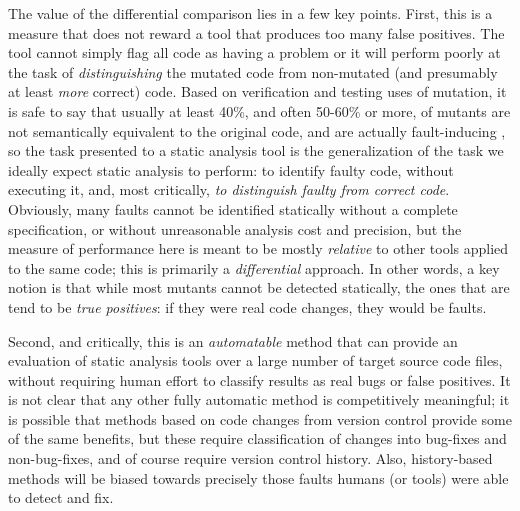 The value of the differential comparison lies in a few key points.  First, this is a measure that does not reward a tool that produces too many false positives.  The tool cannot simply flag all code as having a problem or it will perform poorly at the task of \emph{distinguishing} the mutated code from non-mutated (and presumably at least \emph{more} correct) code.  Based on verification and testing uses of mutation, it is safe to say that usually at least 40\%, and often 50-60\% or more, of mutants are not semantically equivalent to the original code, and are actually fault-inducing \cite{TCE,groce2015verified,groce2018verified,impactEquiv,smith2009should}, so the task presented to a static analysis tool is the generalization of the task we ideally expect static analysis to perform:  to identify faulty code, without executing it, and, most critically, \emph{to distinguish faulty from correct code}.  Obviously, many faults cannot be identified statically without a complete specification, or without unreasonable analysis cost and precision, but the measure of performance here is meant to be mostly \emph{relative} to other tools applied to the same code; this is primarily a \emph{differential} approach.  In other words, a key notion is that while most mutants cannot be detected statically, the ones that are tend to be \emph{true positives}: if they were real code changes, they would be faults.

Second, and critically, this is an \emph{automatable} method that can provide an evaluation of static analysis tools over a large number of target source code files, without requiring human effort to classify results as real bugs or false positives.  It is not clear that any other fully automatic method is competitively meaningful; it is possible that methods based on code changes from version control provide some of the same benefits, but these require classification of changes into bug-fixes and non-bug-fixes, and of course require version control history.  Also, history-based methods will be biased towards precisely those faults humans (or tools) were able to detect and fix.

